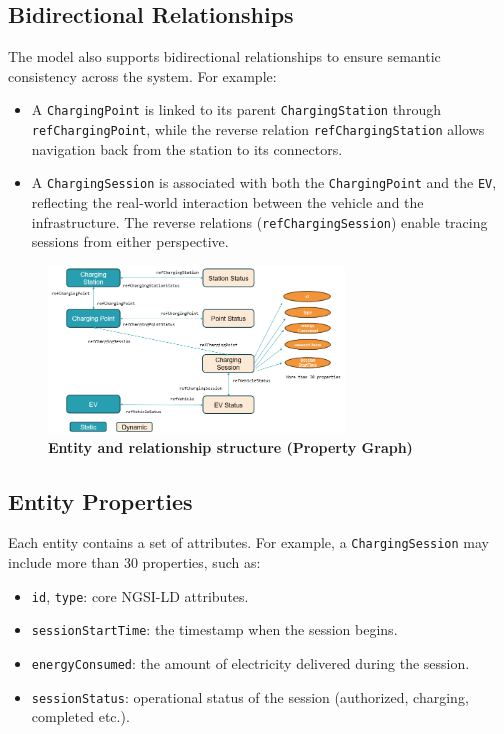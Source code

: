 \subsection*{Bidirectional Relationships}
The model also supports bidirectional relationships to ensure semantic consistency across the system. For example:
\begin{itemize}
    \item A \texttt{ChargingPoint} is linked to its parent \texttt{ChargingStation} through \texttt{refChargingPoint}, while the reverse relation \texttt{refChargingStation} allows navigation back from the station to its connectors.
    \item A \texttt{ChargingSession} is associated with both the \texttt{ChargingPoint} and the \texttt{EV}, reflecting the real-world interaction between the vehicle and the infrastructure. The reverse relations (\texttt{refChargingSession}) enable tracing sessions from either perspective.
\end{itemize}

\begin{figure}[ht!]
    \centering
    \includegraphics[width=0.7\textwidth]{Images/Property Graph.png}
    \caption{\textbf{Entity and relationship structure (Property Graph)}}
    \label{fig:PropertyGraph}
\end{figure}

\subsection*{Entity Properties}
Each entity contains a set of attributes. For example, a \texttt{ChargingSession} may include more than 30 properties, such as:
\begin{itemize}
    \item \texttt{id}, \texttt{type}: core NGSI-LD attributes.
    \item \texttt{sessionStartTime}: the timestamp when the session begins.
    \item \texttt{energyConsumed}: the amount of electricity delivered during the session.
    \item \texttt{sessionStatus}: operational status of the session (authorized, charging, completed etc\@.).
\end{itemize}

